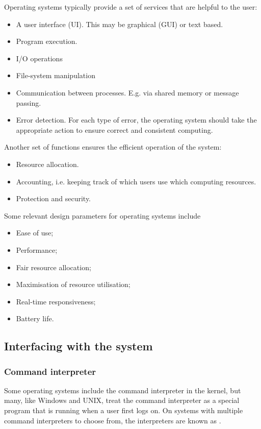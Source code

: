 Operating systems typically provide a set of services that are helpful to the user:
\begin{itemize}
\item A user interface (UI). This may be graphical (GUI) or text based.
\item Program execution.
\item I/O operations
\item File-system manipulation
\item Communication between processes. E.g. via shared memory or message passing.
\item Error detection. For each type of error, the operating system should take the appropriate action to ensure correct and consistent computing.
\end{itemize}
Another set of functions ensures the efficient operation of the system:
\begin{itemize}
\item Resource allocation.
\item Accounting, i.e. keeping track of which users use which computing resources.
\item Protection and security.
\end{itemize}
Some relevant design parameters for operating systems include
\begin{itemize}
\item Ease of use;
\item Performance;
\item Fair resource allocation;
\item Maximisation of resource utilisation;
\item Real-time responsiveness;
\item Battery life.
\end{itemize}

\subsection{Interfacing with the system}
\subsubsection{Command interpreter}
Some operating systems include the command interpreter in the kernel, but many, like Windows and UNIX, treat the command interpreter as a special program that is running when a user first logs on. On systems with multiple command interpreters to choose from, the interpreters are known as .

